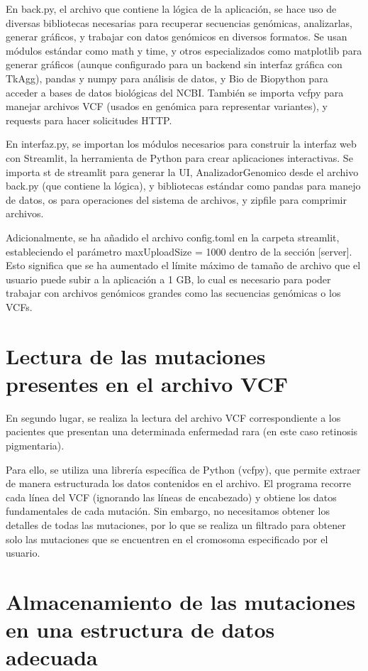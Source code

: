 \documentclass[11pt,spanish,listoffigures,listoftables]{tfgetsinf}
\begin{document}
En back.py, el archivo que contiene la lógica de la aplicación, se hace uso de diversas bibliotecas necesarias para recuperar secuencias genómicas, analizarlas, generar gráficos, y trabajar con datos genómicos en diversos formatos. Se usan módulos estándar como math y time, y otros especializados como matplotlib para generar gráficos (aunque configurado para un backend sin interfaz gráfica con TkAgg), pandas y numpy para análisis de datos, y Bio de Biopython para acceder a bases de datos biológicas del NCBI. También se importa vcfpy para manejar archivos VCF (usados en genómica para representar variantes), y requests para hacer solicitudes HTTP. 

En interfaz.py, se importan los módulos necesarios para construir la interfaz web con Streamlit, la herramienta de Python para crear aplicaciones interactivas. Se importa st de streamlit para generar la UI, AnalizadorGenomico desde el archivo back.py (que contiene la lógica), y bibliotecas estándar como pandas para manejo de datos, os para operaciones del sistema de archivos, y zipfile para comprimir archivos.  

Adicionalmente, se ha añadido el archivo config.toml en la carpeta streamlit, estableciendo el parámetro maxUploadSize = 1000 dentro de la sección [server]. Esto significa que se ha aumentado el límite máximo de tamaño de archivo que el usuario puede subir a la aplicación a 1 GB, lo cual es necesario para poder trabajar con archivos genómicos grandes como las secuencias genómicas o los VCFs. 


\section{Lectura de las mutaciones presentes en el archivo VCF}

En segundo lugar, se realiza la lectura del archivo VCF correspondiente a los pacientes que presentan una determinada enfermedad rara (en este caso retinosis pigmentaria). 

Para ello, se utiliza una librería específica de Python (vcfpy), que permite extraer de manera estructurada los datos contenidos en el archivo. El programa recorre cada línea del VCF (ignorando las líneas de encabezado) y obtiene los datos fundamentales de cada mutación. Sin embargo, no necesitamos obtener los detalles de todas las mutaciones, por lo que se realiza un filtrado para obtener solo las mutaciones que se encuentren en el cromosoma especificado por el usuario. 


\section{Almacenamiento de las mutaciones en una estructura de datos adecuada}
\end{document}
